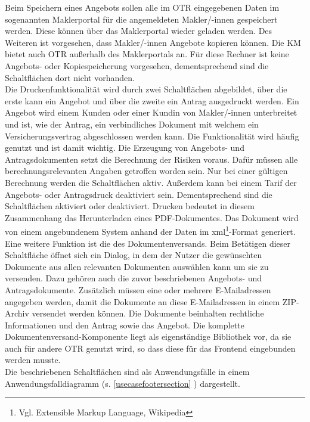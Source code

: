 Beim Speichern eines Angebots sollen alle im \ac{OTR} eingegebenen Daten im sogenannten Maklerportal für die angemeldeten Makler/-innen gespeichert werden. Diese können über das Maklerportal wieder geladen werden. Des Weiteren ist vorgesehen, dass Makler/-innen Angebote kopieren können.
Die \ac{KM} bietet auch \ac{OTR} außerhalb des Maklerportals an. Für diese Rechner ist keine Angebots- oder Kopiespeicherung vorgesehen, dementsprechend sind die Schaltflächen dort nicht vorhanden. \\
Die Druckenfunktionalität wird durch zwei Schaltflächen abgebildet, über die erste kann ein Angebot und über die zweite ein Antrag ausgedruckt werden. Ein Angebot wird einem Kunden oder einer Kundin von Makler/-innen unterbreitet und ist, wie der Antrag, ein verbindliches Dokument mit welchem ein Versicherungsvertrag abgeschlossen werden kann. Die Funktionalität wird häufig genutzt und ist damit wichtig. Die Erzeugung von Angebots- und Antragsdokumenten setzt die Berechnung der Risiken voraus. Dafür müssen alle berechnungsrelevanten Angaben getroffen worden sein. Nur bei einer gültigen Berechnung werden die Schaltflächen aktiv. Außerdem kann bei einem Tarif der Angebots- oder Antragsdruck deaktiviert sein. Dementsprechend sind die Schaltflächen aktiviert oder deaktiviert. Drucken bedeutet in diesem Zusammenhang das Herunterladen eines PDF-Dokumentes. Das Dokument wird von einem angebundenem System anhand der Daten im \gls{xml}\footnote{Vgl.\cite{XML2022} Extensible Markup Language, Wikipedia}-Format generiert.\\
Eine weitere Funktion ist die des Dokumentenversands. Beim Betätigen dieser Schaltfläche öffnet sich ein Dialog, in dem der Nutzer die gewünschten Dokumente aus allen relevanten Dokumenten auswählen kann um sie zu versenden. Dazu gehören auch die zuvor beschriebenen Angebots- und Antragsdokumente. Zusätzlich müssen eine oder mehrere E-Mailadressen angegeben werden, damit die Dokumente an diese E-Mailadressen in einem ZIP-Archiv versendet werden können. Die Dokumente beinhalten rechtliche Informationen und den Antrag sowie das Angebot. Die komplette Dokumentenversand-Komponente liegt als eigenständige Bibliothek vor, da sie auch für andere \ac{OTR} genutzt wird, so dass diese für das Frontend eingebunden werden musste.\\
Die beschriebenen Schaltflächen sind als Anwendungsfälle in einem Anwendungsfalldiagramm (s. \ref{usecasefootersection} ) dargestellt.

